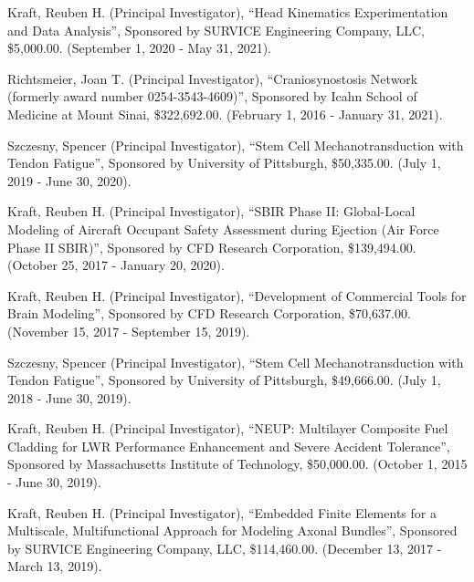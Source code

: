 \documentclass[a4paper,10pt]{article}
\begin{document}
        \noindent Kraft, Reuben H. (Principal Investigator), ``Head Kinematics Experimentation and Data Analysis'', Sponsored by SURVICE Engineering Company, LLC, \$5,000.00. (September 1, 2020 - May 31, 2021).\vspace{0.25cm}
        
        \noindent Richtsmeier, Joan T. (Principal Investigator), ``Craniosynostosis Network (formerly award number 0254-3543-4609)'', Sponsored by Icahn School of Medicine at Mount Sinai, \$322,692.00. (February 1, 2016 - January 31, 2021).\vspace{0.25cm}
        
        \noindent Szczesny, Spencer (Principal Investigator), ``Stem Cell Mechanotransduction with Tendon Fatigue'', Sponsored by University of Pittsburgh, \$50,335.00. (July 1, 2019 - June 30, 2020).\vspace{0.25cm}
        
        \noindent Kraft, Reuben H. (Principal Investigator), ``SBIR Phase II:    Global-Local Modeling of Aircraft Occupant Safety Assessment during Ejection (Air Force Phase II SBIR)'', Sponsored by CFD Research Corporation, \$139,494.00. (October 25, 2017 - January 20, 2020).\vspace{0.25cm}
        
        \noindent Kraft, Reuben H. (Principal Investigator), ``Development of Commercial Tools for Brain Modeling'', Sponsored by CFD Research Corporation, \$70,637.00. (November 15, 2017 - September 15, 2019).\vspace{0.25cm}
        
        \noindent Szczesny, Spencer (Principal Investigator), ``Stem Cell Mechanotransduction with Tendon Fatigue'', Sponsored by University of Pittsburgh, \$49,666.00. (July 1, 2018 - June 30, 2019).\vspace{0.25cm}
        
        \noindent Kraft, Reuben H. (Principal Investigator), ``NEUP: Multilayer Composite Fuel Cladding for LWR Performance Enhancement and Severe Accident Tolerance'', Sponsored by Massachusetts Institute of Technology, \$50,000.00. (October 1, 2015 - June 30, 2019).\vspace{0.25cm}
        
        \noindent Kraft, Reuben H. (Principal Investigator), ``Embedded Finite Elements for a Multiscale, Multifunctional Approach for Modeling Axonal Bundles'', Sponsored by SURVICE Engineering Company, LLC, \$114,460.00. (December 13, 2017 - March 13, 2019).\vspace{0.25cm}
        
\end{document}
